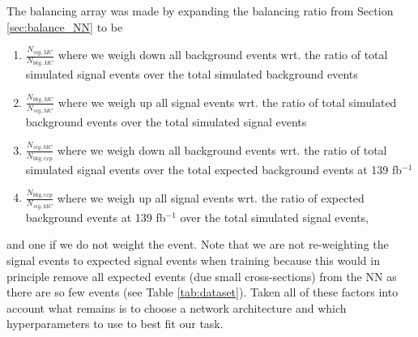 \documentclass[12pt, a4paper]{book}
\begin{document}
The balancing array was made by expanding the balancing ratio from Section \ref{sec:balance_NN} to be
\begin{enumerate}
   \item $\frac{N_{sig,MC}}{N_{bkg,MC}}$ where we weigh down all background events wrt. the ratio of total simulated signal events over the total simulated background events
   \item $\frac{N_{bkg,MC}}{N_{sig,MC}}$ where we weigh up all signal events wrt. the ratio of total simulated background events over the total simulated signal events
   \item $\frac{N_{sig,MC}}{N_{bkg,exp}}$ where we weigh down all background events wrt. the ratio of total simulated signal events over the total expected background events at 139 fb$^{-1}$
   \item $\frac{N_{bkg,exp}}{N_{sig,MC}}$ where we weigh up all signal events wrt. the ratio of expected background events at 139 fb$^{-1}$ over the total simulated signal events, 
\end{enumerate}
and one if we do not weight the event. Note that we are not re-weighting the signal events to expected signal events when training because this would in principle remove all expected events (due small cross-sections) from the NN as there are so few events (see Table \ref{tab:dataset}). 
Taken all of these factors into account what remains is to choose a network architecture and which hyperparameters to use to best fit our task.


\clearpage
\end{document}
